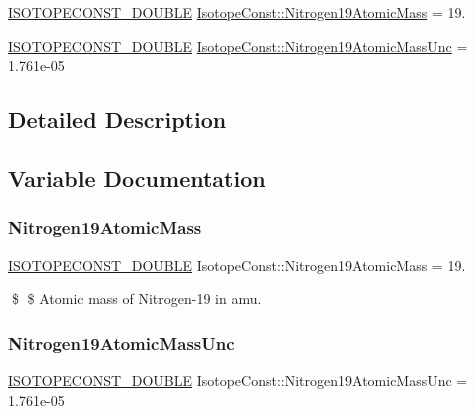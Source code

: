 \begin{DoxyCompactItemize}
\item 
\mbox{\hyperlink{group___isotope_const-_macros_ga8f45a7272ce02c0b4c65c44636ed719a}{I\+S\+O\+T\+O\+P\+E\+C\+O\+N\+S\+T\+\_\+\+D\+O\+U\+B\+LE}} \mbox{\hyperlink{group___isotope_const-_nitrogen-_n19_gaeb83a2b57a2d83b5bf80dc2733c2fb1c}{Isotope\+Const\+::\+Nitrogen19\+Atomic\+Mass}} = 19.
\item 
\mbox{\hyperlink{group___isotope_const-_macros_ga8f45a7272ce02c0b4c65c44636ed719a}{I\+S\+O\+T\+O\+P\+E\+C\+O\+N\+S\+T\+\_\+\+D\+O\+U\+B\+LE}} \mbox{\hyperlink{group___isotope_const-_nitrogen-_n19_gadffec9ff846138bb2fda1cc3f6ba5fe2}{Isotope\+Const\+::\+Nitrogen19\+Atomic\+Mass\+Unc}} = 1.\+761e-\/05
\end{DoxyCompactItemize}


\subsection{Detailed Description}


\subsection{Variable Documentation}
\mbox{\label{group___isotope_const-_nitrogen-_n19_gaeb83a2b57a2d83b5bf80dc2733c2fb1c}} 
\subsubsection{\texorpdfstring{Nitrogen19\+Atomic\+Mass}{Nitrogen19AtomicMass}}
{\footnotesize\ttfamily \mbox{\hyperlink{group___isotope_const-_macros_ga8f45a7272ce02c0b4c65c44636ed719a}{I\+S\+O\+T\+O\+P\+E\+C\+O\+N\+S\+T\+\_\+\+D\+O\+U\+B\+LE}} Isotope\+Const\+::\+Nitrogen19\+Atomic\+Mass = 19.}

\$ \$ Atomic mass of Nitrogen-\/19 in amu. \mbox{\label{group___isotope_const-_nitrogen-_n19_gadffec9ff846138bb2fda1cc3f6ba5fe2}} 
\subsubsection{\texorpdfstring{Nitrogen19\+Atomic\+Mass\+Unc}{Nitrogen19AtomicMassUnc}}
{\footnotesize\ttfamily \mbox{\hyperlink{group___isotope_const-_macros_ga8f45a7272ce02c0b4c65c44636ed719a}{I\+S\+O\+T\+O\+P\+E\+C\+O\+N\+S\+T\+\_\+\+D\+O\+U\+B\+LE}} Isotope\+Const\+::\+Nitrogen19\+Atomic\+Mass\+Unc = 1.\+761e-\/05}

